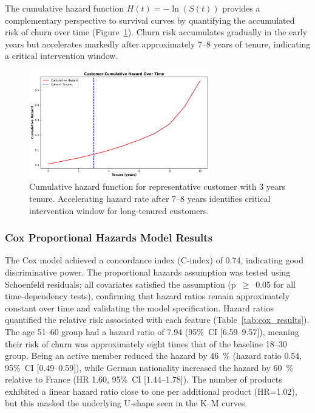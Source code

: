 \documentclass[12pt]{article}
\begin{document}
The cumulative hazard function \(H(t) = -\ln(S(t))\) provides a complementary perspective to survival curves by quantifying the accumulated risk of churn over time (Figure~\ref{fig:cumulative_hazard}). Churn risk accumulates gradually in the early years but accelerates markedly after approximately 7–8 years of tenure, indicating a critical intervention window.

\begin{figure}[H]
\centering
\includegraphics[width=0.7\textwidth]{../img/cumulative_hazard_plot.png}
\caption{Cumulative hazard function for representative customer with 3 years tenure. Accelerating hazard rate after 7–8 years identifies critical intervention window for long‑tenured customers.}
\label{fig:cumulative_hazard}
\end{figure}

\subsubsection{Cox Proportional Hazards Model Results}
The Cox model achieved a concordance index (C‑index) of 0.74, indicating good discriminative power. The proportional hazards assumption was tested using Schoenfeld residuals; all covariates satisfied the assumption (p~$\geq$~0.05 for all time-dependency tests), confirming that hazard ratios remain approximately constant over time and validating the model specification. Hazard ratios quantified the relative risk associated with each feature (Table~\ref{tab:cox_results}). The age 51–60 group had a hazard ratio of 7.94 (95\%~CI [6.59–9.57]), meaning their risk of churn was approximately eight times that of the baseline 18–30 group. Being an active member reduced the hazard by 46~\% (hazard ratio 0.54, 95\%~CI [0.49–0.59]), while German nationality increased the hazard by 60~\% relative to France (HR 1.60, 95\%~CI [1.44–1.78]). The number of products exhibited a linear hazard ratio close to one per additional product (HR=1.02), but this masked the underlying U‑shape seen in the K–M curves.
\end{document}

